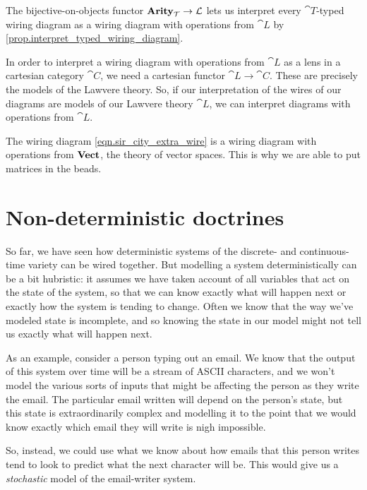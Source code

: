\documentclass[DynamicalBook]{subfiles}
\begin{document}
\begin{remark}
The bijective-on-objects functor $\textbf{Arity}_{\mathcal{T}} \to \mathcal{L}$ lets
us interpret every $\cat{T}$-typed wiring diagram as a wiring diagram with
operations from $\cat{L}$ by \cref{prop.interpret_typed_wiring_diagram}.
\end{remark}

In order to interpret a wiring diagram with operations from $\cat{L}$ as a lens
in a cartesian category $\cat{C}$, we need a cartesian functor $\cat{L} \to
\cat{C}$. These are precisely the models of the Lawvere theory. So, if our
interpretation of the wires
of our diagrams are models of our Lawvere theory $\cat{L}$, we can interpret
diagrams with operations from $\cat{L}$.


\begin{example}
  The wiring diagram \cref{eqn.sir_city_extra_wire} is a wiring diagram with
  operations from $\textbf{Vect}$, the theory of vector spaces. This is why we are
  able to put matrices in the beads.
\end{example}


\section{Non-deterministic doctrines}\label{sec.non_deterministic_systems}

So far, we have seen how deterministic systems of the discrete- and
continuous-time variety can be wired together. But modelling a system
deterministically can be a bit hubristic: it assumes we have taken account of
all variables that act on the state of the system, so that we can know exactly
what will happen next or exactly how the system is tending to change. Often we
know that the way we've modeled state is incomplete, and so knowing the state in
our model might not tell us exactly what will happen next.

As an example, consider a person typing out an email. We know that the output of
this system over time will be a stream of ASCII characters, and we won't model the various sorts
of inputs that might be affecting the person as they write the email. The
particular email written will depend on the person's state, but this state is
extraordinarily complex and modelling it to the point that we would know exactly
which email they will write is nigh impossible. 

So, instead, we could use what
we know about how emails that this person writes tend to look to predict what
the next character will be. This would give us a \emph{stochastic} model of the
email-writer system.
\end{document}
